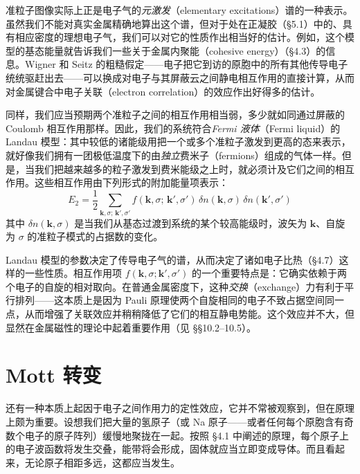 准粒子图像实际上正是电子气的\emph{元激发}（elementary excitations）谱的一种表示。虽然我们不能对真实金属精确地算出这个谱，但对于处在正凝胶（§5.1）中的、具有相应密度的理想电子气，我们可以对它的性质作出相当好的估计。例如，这个模型的基态能量就告诉我们一些关于金属内聚能（cohesive energy）（§4.3）的信息。Wigner 和 Seitz 的粗糙假定——电子把它到访的原胞中的所有其他传导电子统统驱赶出去——可以换成对电子与其屏蔽云之间静电相互作用的直接计算，从而对金属键合中电子关联（electron correlation）的效应作出好得多的估计。

同样，我们应当预期两个准粒子之间的相互作用相当弱，多少就如同通过屏蔽的 Coulomb 相互作用那样。因此，我们的系统符合\emph{Fermi 液体}（Fermi liquid）的 Landau 模型：其中较低的诸能级用把一个或多个准粒子激发到更高的态来表示，就好像我们拥有一团极低温度下的由\emph{独立}费米子（fermions）组成的气体一样。但是，当我们把越来越多的粒子激发到费米能级之上时，就必须计及它们之间的相互作用。这些相互作用由下列形式的附加能量项表示：
\begin{equation*}
E_{2}=\frac{1}{2}\sum_{\mathbf{k},\sigma;\,\mathbf{k}',\sigma'}f(\mathbf{k},\sigma;\,\mathbf{k}',\sigma')\,\delta n(\mathbf{k},\sigma)\,\delta n(\mathbf{k}',\sigma') \tag{5.69}
\end{equation*}
其中 $\delta n(\mathbf{k},\sigma)$ 是当我们从基态过渡到系统的某个较高能级时，波矢为 $\mathbf{k}$、自旋为 $\sigma$ 的准粒子模式的占据数的变化。

Landau 模型的参数决定了传导电子气的谱，从而决定了诸如电子比热（§4.7）这样的一些性质。相互作用项 $f(\mathbf{k},\sigma;\mathbf{k}',\sigma')$ 的一个重要特点是：它确实依赖于两个电子的自旋的相对取向。在普通金属密度下，这种\emph{交换}（exchange）力有利于平行排列——这本质上是因为 Pauli 原理使两个自旋相同的电子不致占据空间同一点，从而增强了关联效应并稍稍降低了它们的相互静电势能。这个效应并不大，但显然在金属磁性的理论中起着重要作用（见 §§10.2--10.5）。

\section{Mott 转变}

还有一种本质上起因于电子之间作用力的定性效应，它并不常被观察到，但在原理上颇为重要。设想我们把大量的氢原子（或 Na 原子——或者任何每个原胞含有奇数个电子的原子阵列）缓慢地聚拢在一起。按照 §4.1 中阐述的原理，每个原子上的电子波函数将发生交叠，能带将会形成，固体就应当立即变成导体。而且看起来，无论原子相距多远，这都应当发生。

